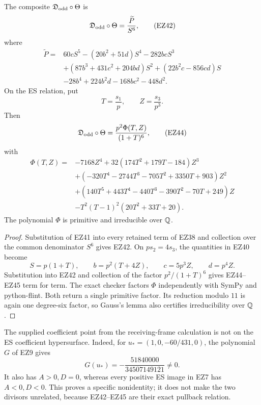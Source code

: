 \begin{theorem}
\label{thm:odd-pullback}
The composite \(\mathfrak D_{\rm odd}\circ\Theta\) is
\begin{equation}
 \mathfrak D_{\rm odd}\circ\Theta=\frac{\widetilde P}{S^6},     \tag{EZ42}
\end{equation}
where
\begin{align*}
\widetilde P={}&60cS^5-(20b^2+51d)S^4-282bcS^3\\
&+(87b^3+431c^2+204bd)S^2+(22b^2c-856cd)S\\
&-28b^4+224b^2d-168bc^2-448d^2.
\end{align*}
On the ES relation, put
\begin{equation}
 T=\frac{s_1}{p},\qquad Z=\frac{s_3}{p^3}.                       \tag{EZ43}
\end{equation}
Then
\begin{equation}
 \mathfrak D_{\rm odd}\circ\Theta
 =\frac{p^2\Phi(T,Z)}{(1+T)^6},                                  \tag{EZ44}
\end{equation}
with
\begin{align}
\Phi(T,Z)={}&-7168Z^4+32(174T^2+179T-184)Z^3\nonumber\\
&+(-320T^4-2744T^3-705T^2+3350T+903)Z^2\nonumber\\
&+(140T^5+443T^4-440T^3-390T^2-70T+249)Z\nonumber\\
&-T^2(T-1)^2(20T^2+33T+20).                              \tag{EZ45}
\end{align}
The polynomial \(\Phi\) is primitive and irreducible over \(\mathbb Q\).
\end{theorem}

\begin{proof}
Substitution of EZ41 into every retained term of EZ38 and collection over the
common denominator \(S^6\) gives EZ42.  On \(ps_2=4s_3\), the quantities in
EZ40 become
\[
 S=p(1+T),\qquad b=p^2(T+4Z),\qquad c=5p^3Z,\qquad d=p^4Z.
\]
Substitution into EZ42 and collection of the factor \(p^2/(1+T)^6\) gives
EZ44--EZ45 term for term.  The exact checker factors \(\Phi\) independently
with SymPy and python-flint.  Both return a single primitive factor.  Its
reduction modulo \(11\) is again one degree-six factor, so Gauss's lemma also
certifies irreducibility over \(\mathbb Q\).
\end{proof}

The supplied coefficient point from the receiving-frame calculation is not on
the ES coefficient hypersurface.  Indeed, for
\(u_*=(1,0,-60/431,0)\), the polynomial \(G\) of EZ9 gives
\begin{equation}
 G(u_*)=-\frac{51840000}{34507149121}\ne0.                        \tag{EZ46}
\end{equation}
It also has \(A>0,D=0\), whereas every positive ES image in EZ7 has
\(A<0,D<0\).  This proves a specific nonidentity; it does not make the two
divisors unrelated, because EZ42--EZ45 are their exact pullback relation.

